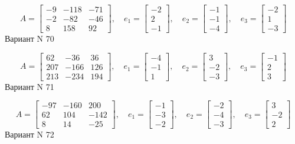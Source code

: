 \documentclass[11pt]{report}
\begin{document}
$$A = \left[\begin{matrix}-9 & -118 & -71\\-2 & -82 & -46\\8 & 158 & 92\end{matrix}\right],\quad e_1 = \left[\begin{matrix}-2\\2\\-1\end{matrix}\right],\quad e_2 = \left[\begin{matrix}-1\\-1\\-4\end{matrix}\right],\quad e_3 = \left[\begin{matrix}-2\\1\\-3\end{matrix}\right]$$Вариант N 70

$$A = \left[\begin{matrix}62 & -36 & 36\\207 & -166 & 126\\213 & -234 & 194\end{matrix}\right],\quad e_1 = \left[\begin{matrix}-4\\-1\\1\end{matrix}\right],\quad e_2 = \left[\begin{matrix}3\\-2\\-3\end{matrix}\right],\quad e_3 = \left[\begin{matrix}-1\\2\\3\end{matrix}\right]$$Вариант N 71

$$A = \left[\begin{matrix}-97 & -160 & 200\\62 & 104 & -142\\8 & 14 & -25\end{matrix}\right],\quad e_1 = \left[\begin{matrix}-1\\-3\\-2\end{matrix}\right],\quad e_2 = \left[\begin{matrix}-2\\-4\\-3\end{matrix}\right],\quad e_3 = \left[\begin{matrix}3\\-2\\2\end{matrix}\right]$$Вариант N 72
\end{document}
